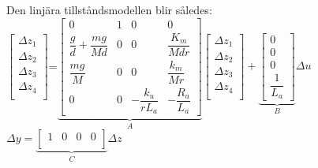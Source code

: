 \documentclass[11pt]{article}
\begin{document}
Den linjära tillståndsmodellen blir således:\\[1em]
$
\begin{bmatrix}
\Delta z_{1}\\
\Delta z_{2}\\
\Delta z_{3}\\
\Delta z_{4}\\
\end{bmatrix}
$=$
\underbrace{
\begin{bmatrix}
0&1&0&0\\
\dfrac{g}{d}+\dfrac{mg}{Md}&0&0&\dfrac{K_m}{Mdr}\\
\dfrac{mg}{M}&0&0&\dfrac{k_m}{Mr}\\
0&0&-\dfrac{k_u}{rL_a}&-\dfrac{R_a}{L_a}
\end{bmatrix}}_{A}
\begin{bmatrix}
\Delta z_1\\
\Delta z_2\\
\Delta z_3\\
\Delta z_4\\
\end{bmatrix}
+
\underbrace{
\begin{bmatrix}
0\\
0\\
0\\
\dfrac{1}{L_a}
\end{bmatrix}}_{B}
\Delta u
$\\[0.5em]
$
\Delta y = \underbrace{\begin{bmatrix}
1&0&0&0\\
\end{bmatrix}}_{C}\Delta z
$
\newpage
\end{document}
